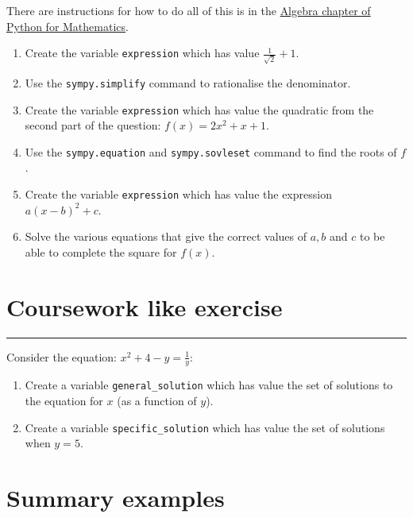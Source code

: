 \documentclass{article}
\begin{document}
There are instructions for how to do all of this is in the
\href{https://vknight.org/pfm/tools-for-mathematics/algebra/how/}{Algebra chapter of Python for Mathematics}.


\begin{enumerate}
\item
  Create the variable \texttt{expression} which has value
        $\frac{1}{\sqrt{2}} + 1$.
\item Use the \texttt{sympy.simplify} command to rationalise the
        denominator.
\item Create the variable \texttt{expression} which has value the
        quadratic from the second part of the question: $f(x) = 2x^ 2 + x + 1$.
\item Use the \texttt{sympy.equation} and
        \texttt{sympy.sovleset} command to find the roots of $f$.
\item Create the variable \texttt{expression} which has value the
        expression $a(x-b) ^ 2 + c$.
\item Solve the various equations that give the correct values of $a, b$ and
    $c$ to be able to complete the square for $f(x)$.
\end{enumerate}


\section{Coursework like exercise}
\hrule


Consider the equation: $x ^ 2 + 4 - y = \frac{1}{y}$:

\begin{enumerate}
    \item Create a variable \texttt{general_solution} which has value the set of solutions to
   the equation for $x$ (as a function of $y$).
\item Create a variable \texttt{specific_solution} which has value the set of solutions when $y = 5$. 
\end{enumerate}

\section{Summary examples}
\end{document}
